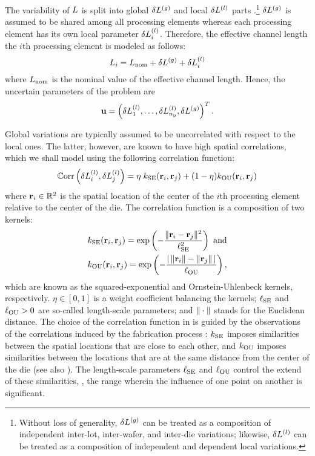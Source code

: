 
The variability of $L$ is split into global ${\delta L^{(g)}}$ and local $\delta L^{(l)}$ parts \cite{chandra2010, shen2009}.\footnote{Without loss of generality, ${\delta L^{(g)}}$ can be treated as a composition of independent inter-lot, inter-wafer, and inter-die variations; likewise, $\delta L^{(l)}$ can be treated as a composition of independent and dependent local variations.}
${\delta L^{(g)}}$ is assumed to be shared among all processing elements whereas each processing element has its own local parameter $\delta L^{(l)}_i$.
Therefore, the effective channel length the $i$th processing element is modeled as follows:
\begin{equation} \elabel{leakage-partition}
  \Leff_i = \nLeff + \gLeff + \lLeff_i
\end{equation}
where $L_\text{nom}$ is the nominal value of the effective channel length.
Hence, the uncertain parameters of the problem are
\begin{equation} \elabel{uncertain-parameters}
  \vU = \vec{\lLeff_1, \dotsc, \lLeff_\nprocs, \gLeff}.
\end{equation}

Global variations are typically assumed to be uncorrelated with respect to the local ones.
The latter, however, are known to have high spatial correlations, which we shall model using the following correlation function:
\begin{equation} \elabel{correlation-function}
  \oCorr{\lLeff_i, \lLeff_j} = \eta \; \fCorrSE(\vR_i, \vR_j) + (1 - \eta) \fCorrOU(\vR_i, \vR_j)
\end{equation}
where $\mathbf{r}_i \in \mathbb{R}^2$ is the spatial location of the center of the $i$th processing element relative to the center of the die. The correlation function is a composition of two kernels:
\begin{align*}
  & k_{\text{SE}}(\mathbf{r}_i, \mathbf{r}_j) = \exp\left(- \frac{\| \mathbf{r}_i - \mathbf{r}_j \|^2}{\ell_{\text{SE}}^2} \right) \text{ and} \\
  & k_{\text{OU}}(\mathbf{r}_i, \mathbf{r}_j) = \exp\left(- \frac{| \,\| \mathbf{r}_i \| - \| \mathbf{r}_j \|\, |}{\ell_{\text{OU}}} \right),
\end{align*}
which are known as the squared-exponential and Ornstein-Uhlenbeck kernels, respectively.
$\eta \in [0, 1]$ is a weight coefficient balancing the kernels; $\ell_{\text{SE}}$ and $\ell_{\text{OU}} > 0$ are so-called length-scale parameters; and $\| \cdot \|$ stands for the Euclidean distance.
The choice of the correlation function in  is guided by the observations of the correlations induced by the fabrication process \cite{chandrakasan2001, friedberg2005, cheng2011}: $k_{\text{SE}}$ imposes similarities between the spatial locations that are close to each other, and $k_{\text{OU}}$ imposes similarities between the locations that are at the same distance from the center of the die (see also \cite{huang2009, ghanem1991, lee2013, bhardwaj2008, ghanta2006}).
The length-scale parameters $\ell_{\text{SE}}$ and $\ell_{\text{OU}}$ control the extend of these similarities, \ie, the range wherein the influence of one point on another is significant.

